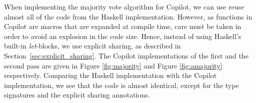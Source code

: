 When implementing the majority vote algorithm for Copilot, we can use reuse
almost all of the code from the Haskell implementation. However, as functions
in Copilot are macros that are expanded at compile time, care must
be taken in order to avoid an explosion in the code size. Hence, instead of
using Haskell's built-in \emph{let}-blocks, we use explicit sharing, as
described in Section~\ref{sec:explicit_sharing}. The Copilot implementations
of the first and the second pass are given in Figure \ref{fig:majority} and
Figure \ref{fig:amajority} respectively. Comparing the Haskell implementation
with the Copilot implementation, we see that the code is almost identical,
except for the type signatures and the explicit sharing annotations.



